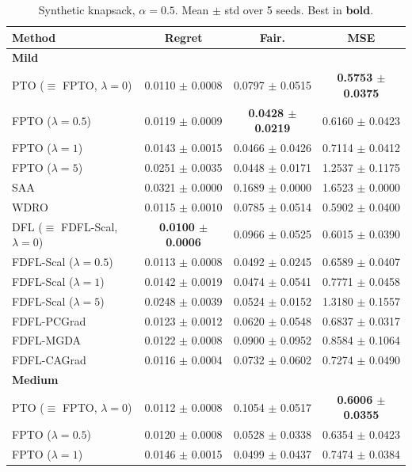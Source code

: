 \documentclass[ijoc,sglanonrev]{informs4}
\begin{document}
\begin{table}[htbp]
\centering
\caption{Synthetic knapsack, $\alpha=0.5$. Mean $\pm$ std over 5 seeds. Best in \textbf{bold}.}
\label{tab:knapsack-a05}
\small
\begin{tabular}{lccc}
\toprule
Method & Regret & Fair. & MSE \\
\midrule
\multicolumn{4}{l}{\textbf{Mild}} \\
PTO ($\equiv$ FPTO, $\lambda=0$) 
    & 0.0110 $\pm$ 0.0008 & 0.0797 $\pm$ 0.0515 & \textbf{0.5753 $\pm$ 0.0375} \\
FPTO ($\lambda=0.5$) 
    & 0.0119 $\pm$ 0.0009 & \textbf{0.0428 $\pm$ 0.0219} & 0.6160 $\pm$ 0.0423 \\
FPTO ($\lambda=1$) 
    & 0.0143 $\pm$ 0.0015 & 0.0466 $\pm$ 0.0426 & 0.7114 $\pm$ 0.0412 \\
FPTO ($\lambda=5$) 
    & 0.0251 $\pm$ 0.0035 & 0.0448 $\pm$ 0.0171 & 1.2537 $\pm$ 0.1175 \\
SAA 
    & 0.0321 $\pm$ 0.0000 & 0.1689 $\pm$ 0.0000 & 1.6523 $\pm$ 0.0000 \\
WDRO 
    & 0.0115 $\pm$ 0.0010 & 0.0785 $\pm$ 0.0514 & 0.5902 $\pm$ 0.0400 \\
DFL ($\equiv$ FDFL-Scal, $\lambda=0$) 
    & \textbf{0.0100 $\pm$ 0.0006} & 0.0966 $\pm$ 0.0525 & 0.6015 $\pm$ 0.0390 \\
FDFL-Scal ($\lambda=0.5$) 
    & 0.0113 $\pm$ 0.0008 & 0.0492 $\pm$ 0.0245 & 0.6589 $\pm$ 0.0407 \\
FDFL-Scal ($\lambda=1$) 
    & 0.0142 $\pm$ 0.0019 & 0.0474 $\pm$ 0.0541 & 0.7771 $\pm$ 0.0458 \\
FDFL-Scal ($\lambda=5$) 
    & 0.0248 $\pm$ 0.0039 & 0.0524 $\pm$ 0.0152 & 1.3180 $\pm$ 0.1557 \\
FDFL-PCGrad 
    & 0.0123 $\pm$ 0.0012 & 0.0620 $\pm$ 0.0548 & 0.6837 $\pm$ 0.0317 \\
FDFL-MGDA 
    & 0.0122 $\pm$ 0.0008 & 0.0900 $\pm$ 0.0952 & 0.8584 $\pm$ 0.1064 \\
FDFL-CAGrad 
    & 0.0116 $\pm$ 0.0004 & 0.0732 $\pm$ 0.0602 & 0.7274 $\pm$ 0.0490 \\
\midrule
\multicolumn{4}{l}{\textbf{Medium}} \\
PTO ($\equiv$ FPTO, $\lambda=0$) 
    & 0.0112 $\pm$ 0.0008 & 0.1054 $\pm$ 0.0517 & \textbf{0.6006 $\pm$ 0.0355} \\
FPTO ($\lambda=0.5$) 
    & 0.0120 $\pm$ 0.0008 & 0.0528 $\pm$ 0.0338 & 0.6354 $\pm$ 0.0423 \\
FPTO ($\lambda=1$) 
    & 0.0146 $\pm$ 0.0015 & 0.0499 $\pm$ 0.0437 & 0.7474 $\pm$ 0.0384 \\

\end{tabular}
\end{table}
\end{document}
